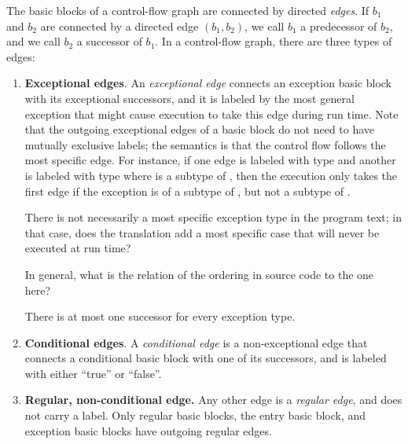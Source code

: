 \begin{definition}
\label{def:edges}
The basic blocks of a control-flow graph are connected by directed
\emph{edges}.  If $b_1$ and $b_2$ are connected by a directed edge
$(b_1,b_2)$, we call $b_1$ a predecessor of $b_2$, and we call $b_2$
a successor of $b_1$.  In a control-flow graph, there are three
types of edges:
\begin{enumerate}
    \item \textbf{Exceptional edges}. An \emph{exceptional edge}
      connects an exception basic block with its exceptional
      successors, and it is labeled by the most general exception that
      might cause execution to take this edge during run time.  Note
      that the outgoing exceptional edges of a basic block do not need
      to have mutually exclusive labels; the semantics is that the
      control flow follows the most specific edge. For instance, if
      one edge is labeled with type  and another is labeled
      with type  where  is a subtype of , then
      the execution only takes the first edge if the exception is of a
      subtype of , but not a subtype of .

\begin{workinprogress}
There is not necessarily a most specific exception type in the program
text; in that case, does the translation add a most specific case that will
never be executed at run time?

In general, what is the relation of the ordering in source code to the
one here?
\end{workinprogress}

    There is at most one successor for every exception type.

    \item \textbf{Conditional edges}. A \emph{conditional edge} is a
      non-exceptional edge that connects a conditional basic block
      with one of its successors, and is labeled with either ``true''
      or ``false''.

    \item \textbf{Regular, non-conditional edge.} Any other edge is a
      \emph{regular edge}, and does not carry a label. Only regular
      basic blocks, the entry basic block, and exception basic blocks
      have outgoing regular edges.
\end{enumerate}
\end{definition}


